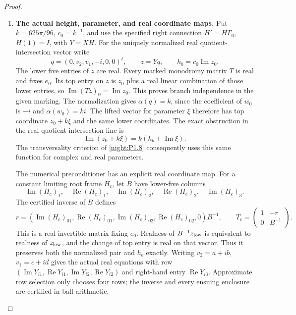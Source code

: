 \documentclass[11pt,a4paper]{article}
\theoremstyle{definition}
\begin{document}
\begin{proof}
\begin{enumerate}[label=\arabic*.]
\item \textbf{The actual height, parameter, and real coordinate maps.}
Put $k=625\pi/96$, $c_0=k^{-1}$, and use the specified right
connection $H'=H\Gamma_6$, $H(1)=I$, with $Y=XH$.
For the uniquely normalized real quotient-intersection vector write
\[
 q=(0,v_2,v_1,-i,0,0)^t,\qquad z=Yq,
 \qquad h_b=c_0\operatorname{Im}z_0.
\]
The lower five entries of $z$ are real. Every marked monodromy
matrix $T$ is real and fixes $e_0$. Its top entry on $z$ is
$z_0$ plus a real linear combination of those lower entries, so
$\operatorname{Im}(Tz)_0=\operatorname{Im}z_0$. This proves
branch independence in the given marking.
The normalization gives $\alpha(q)=k$, since the coefficient of
$w_0$ is $-i$ and $\alpha(w_0)=ki$. The lifted vector for parameter
$\xi$ therefore has top coordinate $z_0+k\xi$ and the same lower
coordinates. The exact obstruction in the real quotient-intersection
line is
\[
 \operatorname{Im}(z_0+k\xi)=k(h_b+\operatorname{Im}\xi).
\]
The transversality criterion of \cref{night:P1.8} consequently
uses this same function for complex and real parameters.

The numerical preconditioner has an explicit real coordinate map.
For a constant limiting root frame $H_c$, let $B$ have lower-five
columns
\[
 \operatorname{Im}(H_c)_1,\quad\operatorname{Re}(H_c)_1,
 \quad\operatorname{Im}(H_c)_2,\quad\operatorname{Re}(H_c)_2,
 \quad\operatorname{Im}(H_c)_3.
\]
The certified inverse of $B$ defines
\[
 r=(\operatorname{Im}(H_c)_{01},\operatorname{Re}(H_c)_{01},
       \operatorname{Im}(H_c)_{02},\operatorname{Re}(H_c)_{02},0)B^{-1},
 \qquad
 T_c=\begin{pmatrix}1&-r\\0&B^{-1}\end{pmatrix}.
\]
This is a real invertible matrix fixing $e_0$.
Realness of $B^{-1}z_{\rm low}$ is equivalent to realness of
$z_{\rm low}$, and the change of top entry is real on that vector.
Thus it preserves both the normalized pair and $h_b$ exactly.
Writing $v_2=a+ib$, $v_1=c+id$ gives the actual real equations
with row
$(\operatorname{Im}Y_{i1},\operatorname{Re}Y_{i1},
\operatorname{Im}Y_{i2},\operatorname{Re}Y_{i2})$
and right-hand entry $\operatorname{Re}Y_{i3}$.
Approximate row selection only chooses four rows; the inverse
and every ensuing enclosure are certified in ball arithmetic.


\end{enumerate}
\end{proof}
\end{document}
